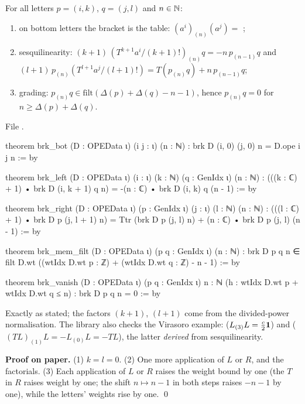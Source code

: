 \begin{theorem}\label{l11:thm:brk}
For all letters $p = (i,k)$, $q = (j,l)$ and $n\in{\mathbb{N}}$:
\begin{enumerate}
\item on bottom letters the bracket is the table: $(a^i)_{(n)}(a^j) = $ ;
\item sesquilinearity: $(k+1)\,(T^{k+1}a^i/(k+1)!)_{(n)}q = -n\,p_{(n-1)}q$ and
  $(l+1)\,p_{(n)}(T^{l+1}a^j/(l+1)!) = T(p_{(n)}q)+n\,p_{(n-1)}q$;
\item grading: $p_{(n)}q\in\mathrm{filt}(\Delta(p)+\Delta(q)-n-1)$, hence $p_{(n)}q = 0$ for $n\ge\Delta(p)+\Delta(q)$.
\end{enumerate}
\end{theorem}
\noindent File .
\begin{leancode}
theorem brk_bot (D : OPEData ι) (i j : ι) (n : ℕ) : brk D (i, 0) (j, 0) n = D.ope i j n := by

theorem brk_left (D : OPEData ι) (i : ι) (k : ℕ) (q : GenIdx ι) (n : ℕ) :
    (((k : ℂ) + 1) • brk D (i, k + 1) q n) = -(n : ℂ) • brk D (i, k) q (n - 1) := by

theorem brk_right (D : OPEData ι) (p : GenIdx ι) (j : ι) (l : ℕ) (n : ℕ) :
    (((l : ℂ) + 1) • brk D p (j, l + 1) n)
      = Ttr (brk D p (j, l) n) + (n : ℂ) • brk D p (j, l) (n - 1) := by

theorem brk_mem_filt (D : OPEData ι) (p q : GenIdx ι) (n : ℕ) :
    brk D p q n ∈ filt D.wt ((wtIdx D.wt p : ℤ) + (wtIdx D.wt q : ℤ) - n - 1) := by

theorem brk_vanish (D : OPEData ι) (p q : GenIdx ι) {n : ℕ}
    (h : wtIdx D.wt p + wtIdx D.wt q ≤ n) : brk D p q n = 0 := by
\end{leancode}

\begin{dictionary}
Exactly as stated; the factors $(k+1)$, $(l+1)$ come from the divided-power normalisation. The library also checks the
Virasoro example:  ($L_{(3)}L = \frac c2\mathbf{1}$) and 
($(TL)_{(1)}L = -L_{(0)}L = -TL$), the latter \emph{derived} from sesquilinearity.
\end{dictionary}

\textbf{Proof on paper.} (1) $k=l=0$. (2) One more application of $L$ or $R$, and the factorials. (3) Each application of $L$
or $R$ raises the weight bound by one (the $T$ in $R$ raises weight by one; the shift $n\mapsto n-1$ in both steps raises
$-n-1$ by one), while the letters' weights rise by one. \qed

